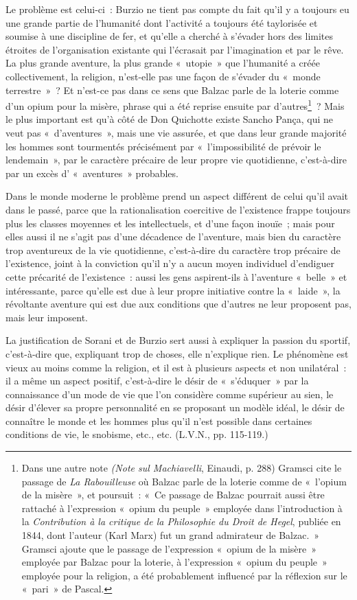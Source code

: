 \documentclass[french,twoside]{book} %
\begin{document}
Le problème est celui-ci : Burzio ne tient pas compte du fait qu’il y a toujours eu une grande partie de l’humanité dont l’activité a toujours été taylorisée et soumise à une discipline de fer, et qu’elle a cherché à s’évader hors des limites étroites de l’organisation existante qui l’écrasait par l’imagination et par le rêve. La plus grande aventure, la plus grande « utopie » que l’humanité a créée collectivement, la religion, n’est-elle pas une façon de s’évader du « monde terrestre » ? Et n’est-ce pas dans ce sens que Balzac parle de la loterie comme d’un opium pour la misère, phrase qui a été reprise ensuite par d’autres\footnote{Dans une autre note \emph{(Note sul Machiavelli}, Einaudi, p. 288) Gramsci cite le passage de \emph{La Rabouilleuse} où Balzac parle de la loterie comme de « l’opium de la misère », et poursuit : « Ce passage de Balzac pourrait aussi être rattaché à l’expression « opium du peuple » employée dans l’introduction à la \emph{Contribution à la critique de la Philosophie du Droit de Hegel}, publiée en 1844, dont l’auteur (Karl Marx) fut un grand admirateur de Balzac. » Gramsci ajoute que le passage de l’expression « opium de la misère » employée par Balzac pour la loterie, à l’expression « opium du peuple » employée pour la religion, a été probablement influencé par la réflexion sur le « pari » de Pascal.} ? Mais le plus important est qu’à côté de Don Quichotte existe Sancho Pança, qui ne veut pas « d’aventures », mais une vie assurée, et que dans leur grande majorité les hommes sont tourmentés précisément par « l’impossibilité de prévoir le lendemain », par le caractère précaire de leur propre vie quotidienne, c’est-à-dire par un excès d’ « aventures » probables.\par
Dans le monde moderne le problème prend un aspect différent de celui qu’il avait dans le passé, parce que la rationalisation coercitive de l’existence frappe toujours plus les classes moyennes et les intellectuels, et d’une façon inouïe ; mais pour elles aussi il ne s’agit pas d’une décadence de l’aventure, mais bien du caractère trop aventureux de la vie quotidienne, c’est-à-dire du caractère trop précaire de l’existence, joint à la conviction qu’il n’y a aucun moyen individuel d’endiguer cette précarité de l’existence : aussi les gens aspirent-ils à l’aventure « belle » et intéressante, parce qu’elle est due à leur propre initiative contre la « laide », la révoltante aventure qui est due aux conditions que d’autres ne leur proposent pas, mais leur imposent.\par
La justification de Sorani et de Burzio sert aussi à expliquer la passion du sportif, c’est-à-dire que, expliquant trop de choses, elle n’explique rien. Le phénomène est vieux au moins comme la religion, et il est à plusieurs aspects et non unilatéral : il a même un aspect positif, c’est-à-dire le désir de « s’éduquer » par la connaissance d’un mode de vie que l’on considère comme supérieur au sien, le désir d’élever sa propre personnalité en se proposant un modèle idéal, le désir de connaître le monde et les hommes plus qu’il n’est possible dans certaines conditions de vie, le snobisme, etc., etc. (L.V.N., pp. 115-119.)\par
{\raggedleft \noindent [1934-1935]}
\end{document}
